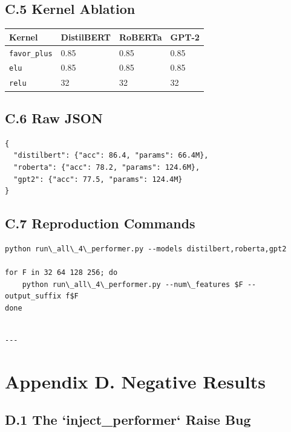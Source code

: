 \subsection{C.5 Kernel Ablation}

\begin{table}[H]
\centering
\small
\begin{tabular}{llll}
\toprule
\textbf{Kernel} & \textbf{DistilBERT} & \textbf{RoBERTa} & \textbf{GPT-2} \\
\midrule
\texttt{favor\_plus} & 0.85 & 0.85 & 0.85 \\
\texttt{elu} & 0.85 & 0.85 & 0.85 \\
\texttt{relu} & 32 & 32 & 32 \\
\bottomrule
\end{tabular}
\end{table}

\subsection{C.6 Raw JSON}

\begin{lstlisting}
{
  "distilbert": {"acc": 86.4, "params": 66.4M},
  "roberta": {"acc": 78.2, "params": 124.6M},
  "gpt2": {"acc": 77.5, "params": 124.4M}
}
\end{lstlisting}

\subsection{C.7 Reproduction Commands}

\begin{lstlisting}
python run\_all\_4\_performer.py --models distilbert,roberta,gpt2

for F in 32 64 128 256; do
    python run\_all\_4\_performer.py --num\_features $F --output_suffix f$F
done
\end{lstlisting}
\begin{lstlisting}

---
\end{lstlisting}


\section{Appendix D. Negative Results}

\subsection{D.1 The `inject\_performer` Raise Bug}

